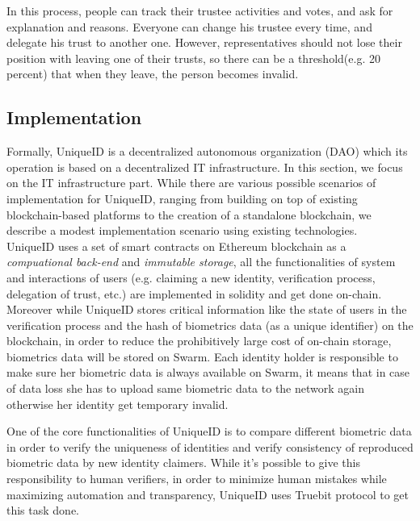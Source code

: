 \documentclass[conference]{IEEEtran}
\begin{document}
In this process, people can track their trustee activities and votes, and ask for explanation and reasons. Everyone can change his trustee every time, and delegate his trust to another one. However, representatives should not lose their position with leaving one of their trusts, so there can be a threshold(e.g. 20 percent) that when they leave, the person becomes invalid. 



\subsection{Implementation}
Formally, UniqueID is a decentralized autonomous organization (DAO) which its operation is based on a decentralized IT infrastructure. In this section, we focus on the IT infrastructure part. While there are various possible scenarios of implementation for UniqueID, ranging from building on top of existing blockchain-based platforms to the creation of a standalone blockchain, we describe a modest implementation scenario using existing technologies.\\

UniqueID uses a set of smart contracts on Ethereum blockchain as a \textit{compuational back-end} and \textit{immutable storage}, all the functionalities of system and interactions of users (e.g. claiming a new identity, verification process, delegation of trust, etc.) are implemented in solidity and get done on-chain. Moreover while UniqueID stores critical information like the state of users in the verification process and the hash of biometrics data (as a unique identifier) on the blockchain, in order to reduce the prohibitively large cost of on-chain storage, biometrics data will be stored on Swarm. Each identity holder is responsible to make sure her biometric data is always available on Swarm, it means that in case of data loss she has to upload same biometric data to the network again otherwise her identity get temporary invalid.

One of the core functionalities of UniqueID is to compare different biometric data in order to verify the uniqueness of identities and verify consistency of reproduced biometric data by new identity claimers. While it's possible to give this responsibility to human verifiers, in order to minimize human mistakes while maximizing automation and transparency, UniqueID uses Truebit \cite{Truebit} protocol to get this task done. 
\end{document}

